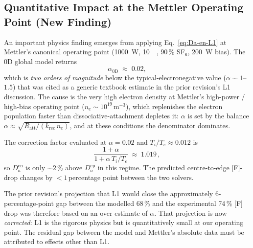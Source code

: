 \documentclass[11pt,a4paper]{report}
\begin{document}
\subsection{Quantitative Impact at the Mettler Operating Point (New Finding)}
\label{sec:L1-finding-alpha-small}

An important physics finding emerges from applying Eq.~\ref{eq:Da-en-L1} at Mettler's canonical operating point (\SI{1000}{\watt}, \SI{10}{\milli\torr}, 90\,\% SF$_6$, \SI{200}{\watt} bias).  The 0D global model returns
\[
  \alpha_{0\mathrm{D}} \;\approx\; 0.02,
\]
which is \emph{two orders of magnitude} below the typical-electronegative value ($\alpha \sim 1$--$1.5$) that was cited as a generic textbook estimate in the prior revision's L1 discussion.  The cause is the very high electron density at Mettler's high-power / high-bias operating point ($n_e \sim 10^{19}$\,m$^{-3}$), which replenishes the electron population faster than dissociative-attachment depletes it: $\alpha$ is set by the balance $\alpha \approx \sqrt{R_\mathrm{att}/(k_\mathrm{rec}\,n_e)}$, and at these conditions the denominator dominates.

The correction factor evaluated at $\alpha = 0.02$ and $T_i/T_e \approx 0.012$ is
\[
  \frac{1+\alpha}{1+\alpha\,T_i/T_e} \;\approx\; 1.019\,,
\]
so $D_a^\mathrm{en}$ is only $\sim 2\,\%$ above $D_a^\mathrm{ep}$ in this regime.  The predicted centre-to-edge [F]-drop changes by ${<}1$\,percentage point between the two solvers.

The prior revision's projection that L1 would close the approximately 6-percentage-point gap between the modelled 68\,\% and the experimental 74\,\% [F] drop was therefore based on an over-estimate of $\alpha$.  That projection is now \emph{corrected}: L1 is the rigorous physics but is quantitatively small at our operating point.  The residual gap between the model and Mettler's absolute data must be attributed to effects other than L1.
\end{document}
